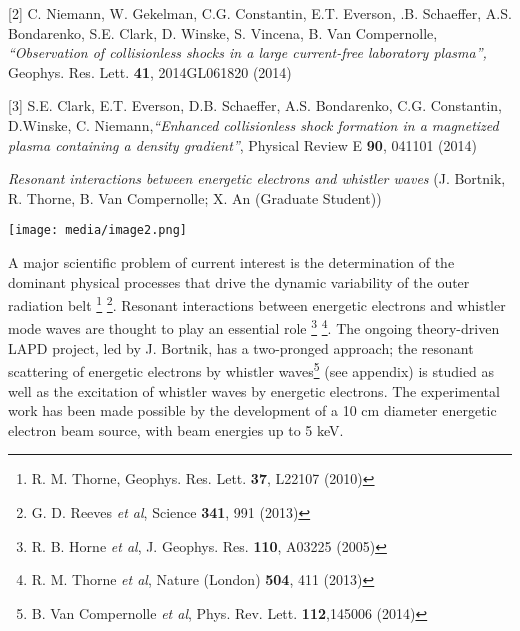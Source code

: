 \documentclass[11pt]{article}
\begin{document}
\begin{description}
{[}2{]} C. Niemann, W. Gekelman, C.G. Constantin, E.T. Everson, .B.
Schaeffer, A.S. Bondarenko, S.E. Clark, D. Winske, S. Vincena, B. Van
Compernolle, \emph{``Observation of collisionless shocks in a large
current-free laboratory plasma'',} Geophys. Res. Lett. \textbf{41},
2014GL061820 (2014)

{[}3{]} S.E. Clark, E.T. Everson, D.B. Schaeffer, A.S. Bondarenko, C.G.
Constantin, D.Winske, C. Niemann,\emph{``Enhanced collisionless shock
formation in a magnetized plasma containing a density gradient''},
Physical Review E \textbf{90}, 041101 (2014)

\emph{Resonant interactions between energetic electrons and whistler
waves} (J. Bortnik, R. Thorne, B. Van Compernolle; X. An (Graduate
Student))

\texttt{[image: media/image2.png]}

A major scientific problem of current interest is the determination of
the dominant physical processes that drive the dynamic variability of
the outer radiation belt \footnote{R. M. Thorne, Geophys. Res. Lett.
  \textbf{37}, L22107 (2010)} \footnote{G. D. Reeves \emph{et al},
  Science \textbf{341}, 991 (2013)}. Resonant interactions between
energetic electrons and whistler mode waves are thought to play an
essential role \footnote{R. B. Horne \emph{et al}, J. Geophys. Res.
  \textbf{110}, A03225 (2005)} \footnote{R. M. Thorne \emph{et al},
  Nature (London) \textbf{504}, 411 (2013)}. The ongoing theory-driven
LAPD project, led by J. Bortnik, has a two-pronged approach; the
resonant scattering of energetic electrons by whistler waves\footnote{B.
  Van Compernolle \emph{et al}, Phys. Rev. Lett. \textbf{112},145006
  (2014)} (see appendix) is studied as well as the excitation of
whistler waves by energetic electrons. The experimental work has been
made possible by the development of a 10 cm diameter energetic electron
beam source, with beam energies up to 5 keV.


\end{description}
\end{document}
